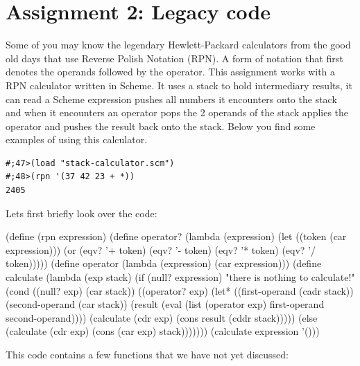 \documentclass[12pt,a4paper,english,twoside]{article}
\begin{document}
\section{Assignment 2: Legacy code}
Some of you may know the legendary Hewlett-Packard calculators from the good 
old days that use Reverse Polish Notation (RPN). A form of notation that first 
denotes the operands followed by the operator. This assignment works with a 
RPN calculator
written in Scheme. It uses a stack to hold intermediary results, it can read a 
Scheme expression pushes all numbers it encounters onto the stack and when it 
encounters an operator pops the 2 operands of the stack applies the operator 
and pushes the result back onto the stack. Below you find some examples of 
using this calculator.
\begin{lstlisting}
#;47>(load "stack-calculator.scm")
#;48>(rpn '(37 42 23 + *))
2405
\end{lstlisting}
Lets first briefly look over the code:
\begin{schemecode}
(define (rpn expression)
  (define operator? 
    (lambda (expression)
      (let ((token (car expression)))
        (or (eqv? '+ token)
            (eqv? '- token)
            (eqv? '* token)
            (eqv? '/ token)))))
  (define operator 
    (lambda (expression) 
      (car expression)))
  (define calculate 
    (lambda (exp stack)
      (if (null? expression)
        "there is nothing to calculate!"
        (cond ((null? exp) (car stack))
              ((operator? exp)
               (let* ((first-operand (cadr stack))
                      (second-operand (car stack))
                      (result (eval (list 
                                      (operator exp) 
                                      first-operand 
                                      second-operand))))
                 (calculate (cdr exp) (cons result (cddr stack)))))
              (else (calculate (cdr exp) (cons (car exp) stack)))))))
  (calculate expression '()))
\end{schemecode}
This code contains a few functions that we have not yet discussed:
\end{document}
